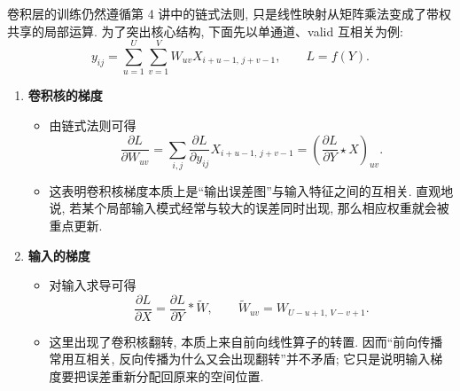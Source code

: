 \documentclass{../nndlcourse}
\begin{document}
卷积层的训练仍然遵循第 4 讲中的链式法则, 只是线性映射从矩阵乘法变成了带权共享的局部运算. 为了突出核心结构, 下面先以单通道、valid 互相关为例:
\begin{equation*}
    y_{ij} = \sum_{u=1}^{U} \sum_{v=1}^{V} W_{uv} X_{i+u-1,\, j+v-1},
    \qquad
    L = f(Y).
\end{equation*}

\begin{enumerate}
    \item \textbf{卷积核的梯度}
    \begin{itemize}
        \item 由链式法则可得
        \begin{equation*}
            \frac{\partial L}{\partial W_{uv}}
            =
            \sum_{i,j}
            \frac{\partial L}{\partial y_{ij}}
            X_{i+u-1,\, j+v-1}
            =
            {\left(\frac{\partial L}{\partial Y} \star X\right)}_{uv}.
        \end{equation*}
        \item 这表明卷积核梯度本质上是“输出误差图”与输入特征之间的互相关. 直观地说, 若某个局部输入模式经常与较大的误差同时出现, 那么相应权重就会被重点更新.
    \end{itemize}

    \item \textbf{输入的梯度}
    \begin{itemize}
        \item 对输入求导可得
        \begin{equation*}
            \frac{\partial L}{\partial X}
            =
            \frac{\partial L}{\partial Y} * \tilde{W},
            \qquad
            \tilde{W}_{uv} = W_{U-u+1,\, V-v+1}.
        \end{equation*}
        \item 这里出现了卷积核翻转, 本质上来自前向线性算子的转置. 因而“前向传播常用互相关, 反向传播为什么又会出现翻转”并不矛盾; 它只是说明输入梯度要把误差重新分配回原来的空间位置.
    \end{itemize}


\end{enumerate}
\end{document}
